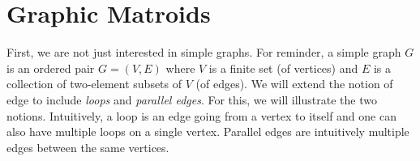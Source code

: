 \section{Graphic Matroids}\label{sec:graphic-matroids}


First, we are not just interested in simple graphs. For reminder, a simple graph $G$ is an ordered pair $G = (V, E)$ where $V$ is a finite set (of vertices) and $E$ is a collection of two-element subsets of $V$ (of edges). We will extend the notion of edge to include \textit{loops} and \textit{parallel edges}. For this, we will illustrate the two notions. Intuitively, a loop is an edge going from a vertex to itself and one can also have multiple loops on a single vertex. Parallel edges are intuitively multiple edges between the same vertices.



